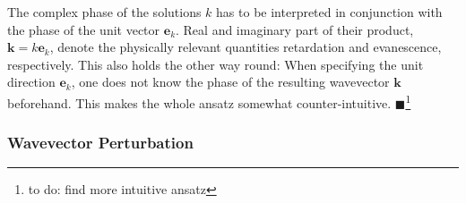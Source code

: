 \documentclass[12pt,a4paper,twoside,openright,BCOR10mm,headsepline,titlepage,abstracton,chapterprefix,final]{scrreprt}
\newcommand\Vector[1]{{\mathbf{#1}}}
\newcommand\wavenumber{k}
\newcommand\Wavevector{\Vector{\wavenumber}}
\newcommand{\remark}[1]{{\color{red}$\blacksquare$}\footnote{{\color{red}#1}}}
\begin{document}
The complex phase of the solutions $\wavenumber$ has to be interpreted
in conjunction with the phase of the unit vector $\Vector{e}_\wavenumber$.
Real and imaginary part of their product, $\Wavevector = \wavenumber \Vector{e}_\wavenumber$, 
denote the physically relevant quantities retardation and evanescence, respectively.
This also holds the other way round: When specifying the unit direction $\Vector{e}_\wavenumber$, 
one does not know the phase of the resulting wavevector $\Wavevector$ beforehand.
This makes the whole ansatz somewhat counter-intuitive.
\remark{to do: find more intuitive ansatz}

\subsubsection{Wavevector Perturbation}
\end{document}
